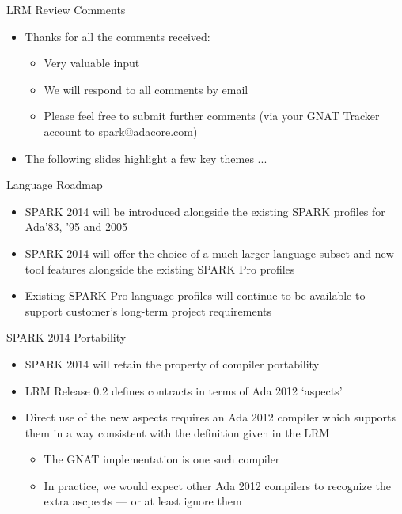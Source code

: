 \documentclass{beamer}
\begin{document}
\begin{frame}{LRM Review Comments}

  \begin{itemize}

  \item Thanks for all the comments received:

    \begin{itemize}
    \item Very valuable input
    \item We will respond to all comments by email
    \item Please feel free to submit further comments (via your GNAT Tracker account to spark@adacore.com)
    \end{itemize}

  \item The following slides highlight a few key themes ...

  \end{itemize}

\end{frame}

\begin{frame}{Language Roadmap}

  \begin{itemize}
  \item SPARK 2014 will be introduced alongside the existing SPARK profiles for Ada'83, '95 and 2005
  \item SPARK 2014 will offer the choice of a much larger language subset and new tool features alongside the existing SPARK Pro profiles
  \item Existing SPARK Pro language profiles will continue to be available to support customer's long-term project requirements
  \end{itemize}
 
\end{frame}

\begin{frame}{SPARK 2014 Portability}

  \begin{itemize}
  \item SPARK 2014 will retain the property of compiler portability

  \item LRM Release 0.2 defines contracts in terms of Ada 2012 `aspects'

  \item Direct use of the new aspects requires an Ada 2012 compiler which supports them in a way consistent with the definition given in the LRM

    \begin{itemize}
    \item The GNAT implementation is one such compiler
    \item In practice, we would expect other Ada 2012 compilers to recognize the extra ascpects --- or at least ignore them
    \end{itemize}

\end{itemize}

\end{frame}
\end{document}
